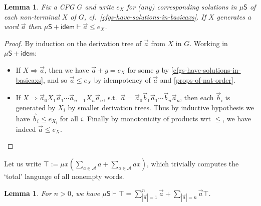 \documentclass[a4paper,10pt]{amsart}
\newcommand{\df}{:=}
\newtheorem{lemma}[theorem]{Lemma}
\theoremstyle{definition}
\newcommand{\Alphabet}{\mathcal{A}}
\newcommand{\proves}{\vdash}
\newcommand{\basicax}{\mu\mathsf{S}}
\newcommand{\idem}{\mathsf{idem}}
\begin{document}
\begin{lemma}
\label{lem:membership}
    Fix a CFG $G $ and write $ e_X$ for (any) corresponding solutions in $\basicax$ of each non-terminal $X$ of $G$, cf.~\cref{cfgs-have-solutions-in-basicaxs}. 
    If $X$ generates a word $\vec a$ then $\basicax + \idem \proves \vec a \leq e_X$.
\end{lemma}
\begin{proof}
    By induction on the derivation tree of $\vec a $ from $X$ in $G$.
    Working in $\basicax+\idem$:
    \begin{itemize}
        \item If $X \Rightarrow \vec a$, then we have $\vec a + g = e_X$ for some $g$ by \cref{cfgs-have-solutions-in-basicaxs}, and so $\vec a \leq e_X$ by idempotency of $\vec a$ and \cref{props-of-nat-order}.
        \item If $X \Rightarrow \vec a_0 X_1 \vec a_1 \cdots \vec a_{n-1}  X_n \vec a_n$, s.t.\ $\vec a = \vec a_0 \vec b_1 \vec a_1 \cdots \vec b_n \vec a_n$, then each $\vec b_i $ is generated by $X_i$ by smaller derivation trees.
        Thus by inductive hypothesis we have $\vec b_i \leq e_{X_i}$ for all $i$.
        Finally by monotonicity of products wrt $\leq$, we have indeed $\vec a \leq e_X$.\qedhere
    \end{itemize}
\end{proof}

Let us write $\top \df \mu x \left(\sum\limits_{a \in \Alphabet} a + \sum\limits_{a\in \Alphabet} ax \right)$, which trivially computes the `total' language of all nonempty words.

\begin{lemma}
\label{lem:unfolding-top}
    For $n>0$, we have $\basicax \proves \top = \sum\limits_{|\vec a|=1}^{n}\vec a + \sum\limits_{|\vec a|= n} \vec a \top$.
\end{lemma}
\end{document}
